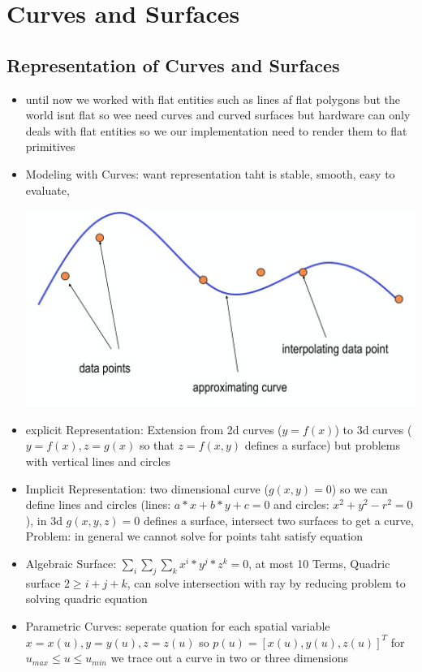 \documentclass[11pt,a4paper]{article}
\begin{document}
\section{Curves and Surfaces}
	\subsection{Representation of Curves and Surfaces}
	\begin{itemize}
		\item until now we worked with flat entities such as lines af flat polygons but the world isnt flat so wee need curves and curved surfaces but hardware can only deals with flat entities so we our implementation need to render them to flat primitives
		\item Modeling with Curves: want representation taht is stable, smooth, easy to evaluate,
		\begin{center}
			\includegraphics[scale=0.5]{pictures/curves.jpg}
		\end{center}
		\item explicit Representation: Extension from 2d curves ($y=f(x)$) to 3d curves ($y=f(x),z=g(x)$ so that $z=f(x,y)$ defines a surface) but problems with vertical lines and circles
		\item Implicit Representation: two dimensional curve ($g(x,y)=0$) so we can define lines and circles (lines: $a*x+b*y+c=0$ and circles: $x^{2}+y^{2}-r^{2}=0$), in 3d $g(x,y,z)=0$ defines a surface, intersect two surfaces to get a curve, Problem: in general we cannot solve for points taht satisfy equation
		\item Algebraic Surface: $\sum_{i}\sum_{j}\sum_{k}x^{i}*y^{j}*z^{k}=0$, at most 10 Terms, Quadric surface $2 \geq i+j+k$, can solve intersection with ray by reducing problem to solving quadric equation
		\item Parametric Curves: seperate quation for each spatial variable $x=x(u),y=y(u),z=z(u)$ so $p(u)=[x(u),y(u),z(u)]^{T}$ for $u_{max} \leq u \leq u_{min}$ we trace out a curve in two or three dimensions

\end{itemize}
\end{document}
